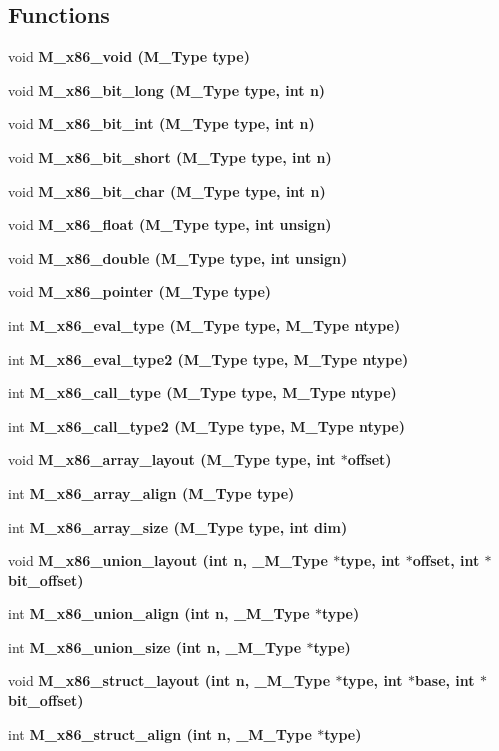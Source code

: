 \subsection*{Functions}
\begin{CompactItemize}
\item 
void \bf{M\_\-x86\_\-void} (\bf{M\_\-Type} type)
\item 
void \bf{M\_\-x86\_\-bit\_\-long} (\bf{M\_\-Type} type, int n)
\item 
void \bf{M\_\-x86\_\-bit\_\-int} (\bf{M\_\-Type} type, int n)
\item 
void \bf{M\_\-x86\_\-bit\_\-short} (\bf{M\_\-Type} type, int n)
\item 
void \bf{M\_\-x86\_\-bit\_\-char} (\bf{M\_\-Type} type, int n)
\item 
void \bf{M\_\-x86\_\-float} (\bf{M\_\-Type} type, int unsign)
\item 
void \bf{M\_\-x86\_\-double} (\bf{M\_\-Type} type, int unsign)
\item 
void \bf{M\_\-x86\_\-pointer} (\bf{M\_\-Type} type)
\item 
int \bf{M\_\-x86\_\-eval\_\-type} (\bf{M\_\-Type} type, \bf{M\_\-Type} ntype)
\item 
int \bf{M\_\-x86\_\-eval\_\-type2} (\bf{M\_\-Type} type, \bf{M\_\-Type} ntype)
\item 
int \bf{M\_\-x86\_\-call\_\-type} (\bf{M\_\-Type} type, \bf{M\_\-Type} ntype)
\item 
int \bf{M\_\-x86\_\-call\_\-type2} (\bf{M\_\-Type} type, \bf{M\_\-Type} ntype)
\item 
void \bf{M\_\-x86\_\-array\_\-layout} (\bf{M\_\-Type} type, int $\ast$offset)
\item 
int \bf{M\_\-x86\_\-array\_\-align} (\bf{M\_\-Type} type)
\item 
int \bf{M\_\-x86\_\-array\_\-size} (\bf{M\_\-Type} type, int dim)
\item 
void \bf{M\_\-x86\_\-union\_\-layout} (int n, \bf{\_\-M\_\-Type} $\ast$type, int $\ast$offset, int $\ast$bit\_\-offset)
\item 
int \bf{M\_\-x86\_\-union\_\-align} (int n, \bf{\_\-M\_\-Type} $\ast$type)
\item 
int \bf{M\_\-x86\_\-union\_\-size} (int n, \bf{\_\-M\_\-Type} $\ast$type)
\item 
void \bf{M\_\-x86\_\-struct\_\-layout} (int n, \bf{\_\-M\_\-Type} $\ast$type, int $\ast$base, int $\ast$bit\_\-offset)
\item 
int \bf{M\_\-x86\_\-struct\_\-align} (int n, \bf{\_\-M\_\-Type} $\ast$type)

\end{CompactItemize}

